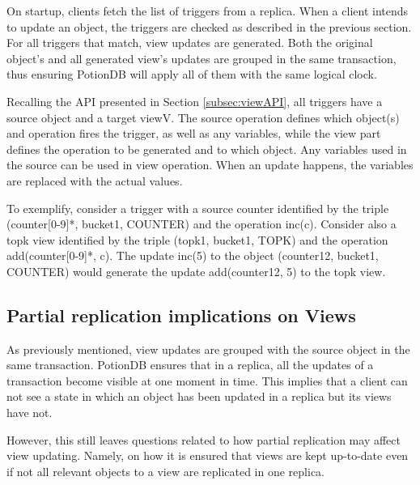 \documentclass{vldb}
\newcommand{\grumbler}[2]{{\color{red}{\bf #1:} #2}}
\renewcommand{\grumbler}[2]{}
\newcommand{\andre}[1]{\grumbler{andre}{#1}}
\begin{document}
On startup, clients fetch the list of triggers from a replica.
When a client intends to update an object, the triggers are checked as described in the previous section.
For all triggers that match, view updates are generated.
Both the original object's and all generated view's updates are grouped in the same transaction, thus ensuring PotionDB will apply all of them with the same logical clock.

Recalling the API presented in Section \ref{subsec:viewAPI}, all triggers have a source object and a target viewV.
The source operation defines which object(s) and operation fires the trigger, as well as any variables, while the view part defines the operation to be generated and to which object.
Any variables used in the source can be used in view operation.
When an update happens, the variables are replaced with the actual values.

\andre{Should I just use a figure/table for this example instead of the paragraph below?}

To exemplify, consider a trigger with a source counter identified by the triple (counter[0-9]*, bucket1, COUNTER) and the operation inc(c).
Consider also a topk view identified by the triple (topk1, bucket1, TOPK) and the operation add(counter[0-9]*, c).
The update inc(5) to the object (counter12, bucket1, COUNTER) would generate the update add(counter12, 5) to the topk view.

\subsection{Partial replication implications on Views}
\label{subsec:partialReplicationViews}

As previously mentioned, view updates are grouped with the source object in the same transaction.
PotionDB ensures that in a replica, all the updates of a transaction become visible at one moment in time.
This implies that a client can not see a state in which an object has been updated in a replica but its views have not.

However, this still leaves questions related to how partial replication may affect view updating. Namely, on how it is ensured that views are kept up-to-date even if not all relevant objects to a view are replicated in one replica.
\end{document}
